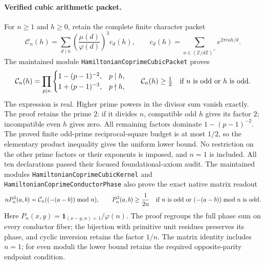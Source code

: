 \paragraph{Verified cubic arithmetic packet.}
For \(n\geq1\) and \(h\geq0\), retain the complete finite character packet
\[
 \mathcal C_n(h)=
 \sum_{d\mid n}\left(\frac{\mu(d)}{\varphi(d)}\right)^3c_d(h),
 \qquad
 c_d(h)=\sum_{u\in(\mathbb Z/d\mathbb Z)^\times}
                   e^{2\pi iuh/d}.
\]
The maintained module \texttt{HamiltonianCoprimeCubicPacket} proves
\[
 \mathcal C_n(h)=
 \prod_{p\mid n}
 \begin{cases}
  1-(p-1)^{-2},&p\mid h,\\
  1+(p-1)^{-3},&p\nmid h,
 \end{cases}
 \qquad
 \mathcal C_n(h)\geq\tfrac12
 \quad\hbox{if \(n\) is odd or \(h\) is odd.}
\]
The expression is real. Higher prime powers in the divisor sum
vanish exactly. The proof retains the prime \(2\): if it divides \(n\),
compatible odd \(h\) gives its factor \(2\); incompatible even \(h\)
gives zero. All remaining factors dominate \(1-(p-1)^{-2}\).
The proved finite odd-prime reciprocal-square budget is at most
\(1/2\), so the elementary product inequality gives the uniform lower
bound. No restriction on the other prime factors or their exponents
is imposed, and \(n=1\) is included.
All ten declarations passed their focused foundational-axiom audit.
The maintained modules \texttt{HamiltonianCoprimeCubicKernel} and
\texttt{HamiltonianCoprimeConductorPhase} also prove the exact native
matrix readout
\[
 nP_n^3(a,b)=\mathcal C_n((-(a-b))\bmod n),
 \qquad
 P_n^3(a,b)\geq\frac1{2n}
 \quad\hbox{if \(n\) is odd or \((-(a-b))\bmod n\) is odd.}
\]
Here \(P_n(x,y)=\mathbf1_{(x-y,n)=1}/\varphi(n)\).
The proof regroups the full phase sum on every conductor fiber;
the bijection with primitive unit residues preserves its phase, and
cyclic inversion retains the factor \(1/n\).
The matrix identity includes \(n=1\); for even moduli the lower bound
retains the required opposite-parity endpoint condition.
